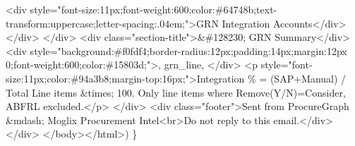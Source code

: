 \documentclass[
]{article}
\newenvironment{Shaded}{\begin{snugshade}}{\end{snugshade}}
\newcommand{\NormalTok}[1]{#1}
\newcommand{\StringTok}[1]{\textcolor[rgb]{0.31,0.60,0.02}{#1}}
\begin{document}
\begin{Shaded}
\begin{Highlighting}[]
\StringTok{        \textless{}div style="font{-}size:11px;font{-}weight:600;color:\#64748b;text{-}transform:uppercase;letter{-}spacing:.04em;"\textgreater{}GRN Integration Accounts\textless{}/div\textgreater{}}
\StringTok{      \textless{}/div\textgreater{}}
\StringTok{    \textless{}/div\textgreater{}}
\StringTok{    \textless{}div class="section{-}title"\textgreater{}\&\#128230; GRN Summary\textless{}/div\textgreater{}}
\StringTok{    \textless{}div style="background:\#f0fdf4;border{-}radius:12px;padding:14px;margin:12px 0;font{-}weight:600;color:\#15803d;"\textgreater{}\textquotesingle{}}\NormalTok{, grn\_line, }\StringTok{\textquotesingle{}\textless{}/div\textgreater{}}
\StringTok{    \textless{}p style="font{-}size:11px;color:\#94a3b8;margin{-}top:16px;"\textgreater{}Integration \% = (SAP+Manual) / Total Line items \&times; 100. Only line items where Remove(Y/N)=Consider, ABFRL excluded.\textless{}/p\textgreater{}}
\StringTok{  \textless{}/div\textgreater{}}
\StringTok{  \textless{}div class="footer"\textgreater{}Sent from ProcureGraph \&mdash; Moglix Procurement Intel\textless{}br\textgreater{}Do not reply to this email.\textless{}/div\textgreater{}}
\StringTok{\textless{}/div\textgreater{}}
\StringTok{\textless{}/body\textgreater{}\textless{}/html\textgreater{}\textquotesingle{}}\NormalTok{)}
\NormalTok{    \}}
    

\end{Highlighting}
\end{Shaded}
\end{document}
